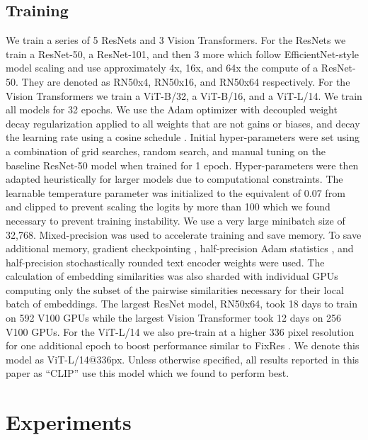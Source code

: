 \documentclass{article}
\begin{document}
\subsection{Training}

We train a series of 5 ResNets and 3 Vision Transformers. For the ResNets we train a ResNet-50, a ResNet-101, and then 3 more which follow EfficientNet-style model scaling and use approximately 4x, 16x, and 64x the compute of a ResNet-50. They are denoted as RN50x4, RN50x16, and RN50x64 respectively. For the Vision Transformers we train a ViT-B/32, a ViT-B/16, and a ViT-L/14. We train all models for 32 epochs. We use the Adam optimizer \citep{kingma2014adam} with decoupled weight decay regularization \citep{loshchilov2017decoupled} applied to all weights that are not gains or biases, and decay the learning rate using a cosine schedule \citep{loshchilov2016sgdr}. Initial hyper-parameters were set using a combination of grid searches, random search, and manual tuning on the baseline ResNet-50 model when trained for 1 epoch. Hyper-parameters were then adapted heuristically for larger models due to computational constraints. The learnable temperature parameter  was initialized to the equivalent of 0.07 from \citep{wu2018unsupervised} and clipped to prevent scaling the logits by more than 100 which we found necessary to prevent training instability. We use a very large minibatch size of 32,768. Mixed-precision \citep{micikevicius2017mixed} was used to accelerate training and save memory. To save additional memory, gradient checkpointing \citep{griewank2000algorithm,chen2016training}, half-precision Adam statistics \citep{dhariwal2020jukebox}, and half-precision stochastically rounded text encoder weights were used. The calculation of embedding similarities was also sharded with individual GPUs computing only the subset of the pairwise similarities necessary for their local batch of embeddings. The largest ResNet model, RN50x64, took 18 days to train on 592 V100 GPUs while the largest Vision Transformer took 12 days on 256 V100 GPUs. For the ViT-L/14 we also pre-train at a higher 336 pixel resolution for one additional epoch to boost performance similar to FixRes \citep{touvron2019fixing}. We denote this model as ViT-L/14@336px. Unless otherwise specified, all results reported in this paper as ``CLIP'' use this model which we found to perform best.







\section{Experiments}
\end{document}
